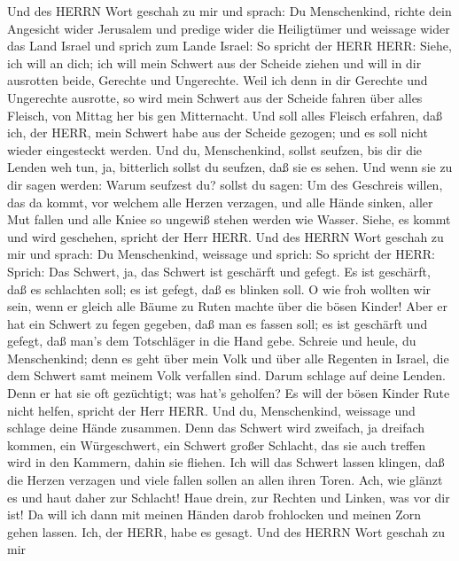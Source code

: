  Und des HERRN Wort geschah zu mir und sprach: 
Du Menschenkind, richte dein Angesicht wider Jerusalem und predige wider
die Heiligtümer und weissage wider das Land Israel  und
sprich zum Lande Israel: So spricht der HERR HERR: Siehe, ich will an
dich; ich will mein Schwert aus der Scheide ziehen und will in dir
ausrotten beide, Gerechte und Ungerechte.  Weil ich denn in
dir Gerechte und Ungerechte ausrotte, so wird mein Schwert aus der
Scheide fahren über alles Fleisch, von Mittag her bis gen Mitternacht.
 Und soll alles Fleisch erfahren, daß ich, der HERR, mein
Schwert habe aus der Scheide gezogen; und es soll nicht wieder
eingesteckt werden.  Und du, Menschenkind, sollst seufzen,
bis dir die Lenden weh tun, ja, bitterlich sollst du seufzen, daß sie es
sehen.  Und wenn sie zu dir sagen werden: Warum seufzest du?
sollst du sagen: Um des Geschreis willen, das da kommt, vor welchem alle
Herzen verzagen, und alle Hände sinken, aller Mut fallen und alle Kniee
so ungewiß stehen werden wie Wasser. Siehe, es kommt und wird geschehen,
spricht der Herr HERR.  Und des HERRN Wort geschah zu mir
und sprach:  Du Menschenkind, weissage und sprich: So
spricht der HERR: Sprich: Das Schwert, ja, das Schwert ist geschärft und
gefegt.  Es ist geschärft, daß es schlachten soll; es ist
gefegt, daß es blinken soll. O wie froh wollten wir sein, wenn er gleich
alle Bäume zu Ruten machte über die bösen Kinder!  Aber er
hat ein Schwert zu fegen gegeben, daß man es fassen soll; es ist
geschärft und gefegt, daß man's dem Totschläger in die Hand gebe.
 Schreie und heule, du Menschenkind; denn es geht über mein
Volk und über alle Regenten in Israel, die dem Schwert samt meinem Volk
verfallen sind. Darum schlage auf deine Lenden.  Denn er
hat sie oft gezüchtigt; was hat's geholfen? Es will der bösen Kinder
Rute nicht helfen, spricht der Herr HERR.  Und du,
Menschenkind, weissage und schlage deine Hände zusammen. Denn das
Schwert wird zweifach, ja dreifach kommen, ein Würgeschwert, ein Schwert
großer Schlacht, das sie auch treffen wird in den Kammern, dahin sie
fliehen.  Ich will das Schwert lassen klingen, daß die
Herzen verzagen und viele fallen sollen an allen ihren Toren. Ach, wie
glänzt es und haut daher zur Schlacht!  Haue drein, zur
Rechten und Linken, was vor dir ist!  Da will ich dann mit
meinen Händen darob frohlocken und meinen Zorn gehen lassen. Ich, der
HERR, habe es gesagt.  Und des HERRN Wort geschah zu mir
